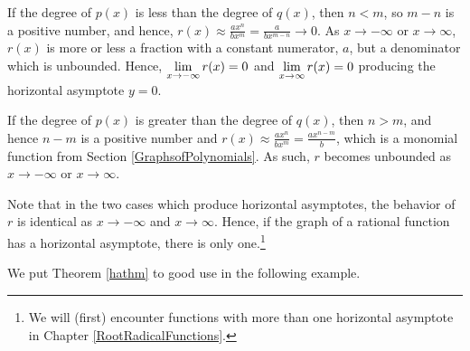 If the degree of $p(x)$ is less than the degree of $q(x)$, then $n < m$, so $m-n$ is a positive number, and hence, $r(x) \approx  \frac{ax^n}{bx^m}  = \frac{a}{bx^{m-n}} \rightarrow 0$.   As $x \rightarrow  -\infty$ or $x \rightarrow \infty$, $r(x)$ is more or less a fraction with a constant numerator, $a$, but a denominator which is unbounded. Hence, $\ds{\lim_{x \rightarrow  -\infty} r(x) = 0}$ and $\ds{\lim_{x \rightarrow  \infty} r(x) = 0}$  producing the horizontal asymptote $y = 0$.   

If the degree of $p(x)$ is greater than the degree of $q(x)$, then $n > m$, and hence $n-m$ is a positive number and $r(x) \approx  \frac{ax^n}{bx^m}  = \frac{ax^{n-m}}{ b}$, which is a monomial function from Section \ref{GraphsofPolynomials}.  As such, $r$ becomes unbounded as $x \rightarrow -\infty$ or $x \rightarrow \infty$.

Note that in the two cases which produce horizontal asymptotes, the behavior of $r$ is identical as $x \rightarrow -\infty$ and $x \rightarrow \infty$.  Hence, if the graph of a rational function has a horizontal asymptote, there is only one.\footnote{We will (first) encounter functions with more than one horizontal asymptote in Chapter \ref{RootRadicalFunctions}.} 

We put Theorem \ref{hathm}  to good use in the following example.
 
